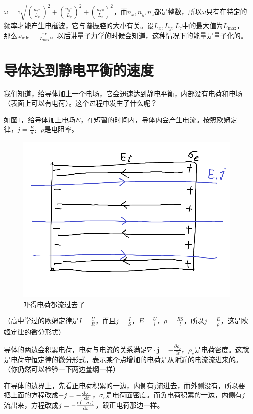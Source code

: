 $\omega=c \sqrt{(\frac{n_x \pi}{L_x})^2+(\frac{n_y \pi}{L_y})^2+(\frac{n_z \pi}{L_z})^2}$，而$n_x,n_y,n_z$都是整数，所以$\omega$只有在特定的频率才能产生电磁波，它与谐振腔的大小有关。设$L_x,L_y,L_z$中的最大值为$L_\text{max}$，那么$\omega_\text{min}=\frac{\pi c}{L_\text{max}}$。以后讲量子力学的时候会知道，这种情况下的能量是量子化的。
\section{导体达到静电平衡的速度}
我们知道，给导体加上一个电场，它会迅速达到静电平衡，内部没有电荷和电场（表面上可以有电荷）。这个过程中发生了什么呢？

如图\ref{fig-elec-equi}，给导体加上电场$E$，在短暂的时间内，导体内会产生电流。按照欧姆定律，$j=\frac{E}{\rho}$，$\rho$是电阻率。
\begin{figure}[htb]
\centering
\includegraphics[scale=0.5]{fig/elec-equi.png}
\caption{吓得电荷都流过去了}
\label{fig-elec-equi}
\end{figure}

（高中学过的欧姆定律是$I=\frac{U}{R}$，而且$j=\frac{I}{S}$，$E=\frac{U}{l}$，$\rho=\frac{R S}{l}$，所以$j=\frac{E}{\rho}$，这是欧姆定律的微分形式）

导体的两边会积累电荷，电荷与电流的关系满足$\nabla \cdot \mathbf{j}=-\frac{\partial \rho_e}{\partial t}$，$\rho_e$是电荷密度。这就是电荷守恒定律的微分形式，表示某个点增加的电荷是从附近的电流流进来的。（你仍然可以检验一下两边量纲一样）

在导体的边界上，先看正电荷积累的一边，内侧有$j$流进去，而外侧没有，所以要把上面的方程改成$-j=-\frac{\mathop{}\!\mathrm{d} \sigma_e}{\mathop{}\!\mathrm{d} t}$，$\sigma_e$是电荷面密度。而负电荷积累的一边，内侧有$j$流出来，方程改成$j=-\frac{\mathop{}\!\mathrm{d} (-\sigma_e)}{\mathop{}\!\mathrm{d} t}$，跟正电荷那边一样。

